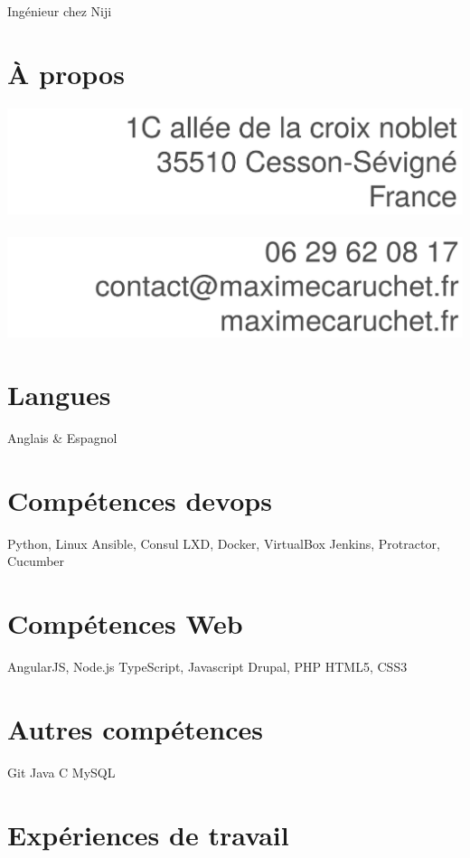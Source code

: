 \documentclass[]{friggeri-cv}
\begin{document}
       {Ingénieur chez Niji}


\begin{aside}
  \section{À propos}
    \includegraphics[width=\textwidth]{personal_details}
    ~
    \includegraphics[width=\textwidth]{personal_details3}
  \section{Langues}
    Anglais \& Espagnol
  \section{Compétences devops}
    Python, Linux
    Ansible, Consul
    LXD, Docker, VirtualBox
    Jenkins, Protractor, Cucumber
  \section{Compétences Web}
    AngularJS, Node.js
    TypeScript, Javascript
    Drupal, PHP
    HTML5, CSS3
  \section{Autres compétences}
    Git
    Java
    C
    MySQL
\end{aside}

\section{Expériences de travail}
\end{document}
